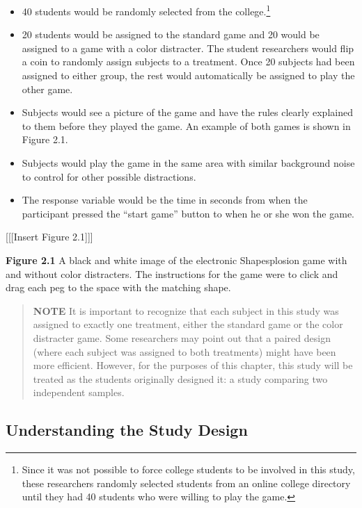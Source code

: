 \documentclass[
]{report}
\providecommand{\tightlist}{%
  \setlength{\itemsep}{0pt}\setlength{\parskip}{0pt}}
\theoremstyle{definition}
\theoremstyle{definition}
\theoremstyle{definition}
\theoremstyle{definition}
\theoremstyle{remark}
\begin{document}
\begin{itemize}
\tightlist
\item
  40 students would be randomly selected from the college.\footnote{Since it was not possible to force college students to be involved in this study, these researchers randomly selected students from an online college directory until they had 40 students who were willing to play the game.}
\item
  20 students would be assigned to the standard game and 20 would be assigned to a game with a color
  distracter. The student researchers would flip a coin to randomly assign subjects to a treatment. Once
  20 subjects had been assigned to either group, the rest would automatically be assigned to play the
  other game.
\item
  Subjects would see a picture of the game and have the rules clearly explained to them before they
  played the game. An example of both games is shown in Figure 2.1.
\item
  Subjects would play the game in the same area with similar background noise to control for other
  possible distractions.
\item
  The response variable would be the time in seconds from when the participant pressed the ``start
  game'' button to when he or she won the game.
\end{itemize}

{[}{[}{[}Insert Figure 2.1{]}{]}{]}

\textbf{Figure 2.1} A black and white image of the electronic Shapesplosion game
with and without color distracters. The instructions for the game were to
click and drag each peg to the space with the matching shape.

\begin{quote}
\textbf{NOTE}
It is important to recognize that each subject in this study was assigned to exactly one treatment, either the standard game or the color distracter game. Some researchers may point out that a paired design (where each subject was assigned to both treatments) might have been more efficient. However, for the purposes of this chapter, this study will be treated as the students originally designed it: a study comparing two independent samples.
\end{quote}

\hypertarget{understanding-the-study-design}{%
\subsection{Understanding the Study Design}\label{understanding-the-study-design}}
\end{document}
